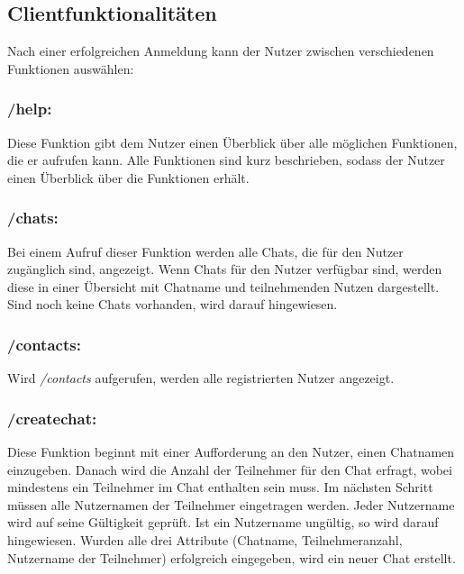 \author{Jan Grübener, Troy Keßler, Patrick Mischka, Michael Angermeier}
\subsection{Clientfunktionalitäten}
Nach einer erfolgreichen Anmeldung kann der Nutzer zwischen verschiedenen Funktionen auswählen:

\subsubsection*{/help:}
Diese Funktion gibt dem Nutzer einen Überblick über alle möglichen Funktionen, die er aufrufen kann.
Alle Funktionen sind kurz beschrieben, sodass der Nutzer einen Überblick über die Funktionen erhält.

\subsubsection*{/chats:}
Bei einem Aufruf dieser Funktion werden alle Chats, die für den Nutzer zugänglich sind, angezeigt.
Wenn Chats für den Nutzer verfügbar sind, werden diese in einer Übersicht mit Chatname und teilnehmenden Nutzen dargestellt.
Sind noch keine Chats vorhanden, wird darauf hingewiesen.

\subsubsection*{/contacts:}
Wird \textit{/contacts} aufgerufen, werden alle registrierten Nutzer angezeigt.

\subsubsection*{/createchat:}
Diese Funktion beginnt mit einer Aufforderung an den Nutzer, einen Chatnamen einzugeben.
Danach wird die Anzahl der Teilnehmer für den Chat erfragt, wobei mindestens ein Teilnehmer im Chat enthalten sein muss.
Im nächsten Schritt müssen alle Nutzernamen der Teilnehmer eingetragen werden. 
Jeder Nutzername wird auf seine Gültigkeit geprüft. Ist ein Nutzername ungültig, so wird darauf hingewiesen. 
Wurden alle drei Attribute (Chatname, Teilnehmeranzahl, Nutzername der Teilnehmer) erfolgreich eingegeben,
wird ein neuer Chat erstellt.

